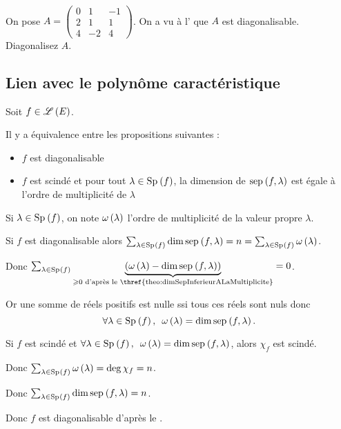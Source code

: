 \begin{exo}~\\
On pose \(A=\begin{pmatrix}
0 & 1 & -1 \\
2 & 1 & 1 \\
4 & -2 & 4
\end{pmatrix}\). On a vu à l' que \(A\) est diagonalisable. Diagonalisez \(A\).
\end{exo}

\subsection{Lien avec le polynôme caractéristique}

\begin{theo}
Soit \(f\in\mathscr{L}\left(E\right)\).

Il y a équivalence entre les propositions suivantes :

\begin{itemize}
    \item \(f\) est diagonalisable \\
    \item \(f\) est scindé et pour tout \(\lambda\in\Sp{f}\), la dimension de \(\sep{f}{\lambda}\) est égale à l'ordre de multiplicité de \(\lambda\)
\end{itemize}
\end{theo}

\begin{dem}
Si \(\lambda\in\Sp{f}\), on note \(\omega\left(\lambda\right)\) l'ordre de multiplicité de la valeur propre \(\lambda\).

\impdir

Si \(f\) est diagonalisable alors \(\sum_{\lambda\in\Sp{f}}\dim\sep{f}{\lambda}=n=\sum_{\lambda\in\Sp{f}}\omega\paren{\lambda}\).

Donc \(\sum_{\lambda\in\Sp{f}}\underbrace{\paren{\omega\paren{\lambda}-\dim\sep{f}{\lambda}}}_{\geq0\text{ d'après le \thref{theo:dimSepInferieurALaMultiplicite}}}=0\).

Or une somme de réels positifs est nulle ssi tous ces réels sont nuls donc \[\quantifs{\forall\lambda\in\Sp{f}}\omega\paren{\lambda}=\dim\sep{f}{\lambda}.\]

\imprec

Si \(f\) est scindé et \(\quantifs{\forall\lambda\in\Sp{f}}\omega\paren{\lambda}=\dim\sep{f}{\lambda}\), alors \(\chi_f\) est scindé.

Donc \(\sum_{\lambda\in\Sp{f}}\omega\paren{\lambda}=\deg\chi_f=n\).

Donc \(\sum_{\lambda\in\Sp{f}}\dim\sep{f}{\lambda}=n\).

Donc \(f\) est diagonalisable d'après le .
\end{dem}

